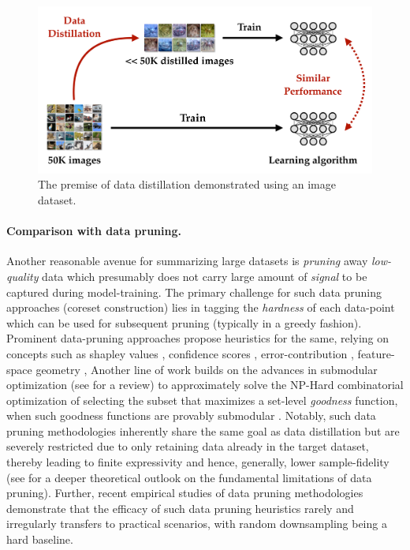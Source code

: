 \documentclass[10pt]{article} %
\begin{document}
\begin{figure}[t!] \centering
    \centering
    \includegraphics[width=0.7\linewidth]{figures/overview.pdf}
    \renewcommand\figurename{\href{https://www.noveens.com/images/dd_survey/overview.pdf}{[HQ Image Link]} Figure}
    \caption{The premise of data distillation demonstrated using an image dataset.}
    \vspace{-0.1cm}
    \label{fig:overview}
\end{figure} 

\paragraph{Comparison with data pruning.} Another reasonable avenue for summarizing large datasets is \emph{pruning} away \emph{low-quality} data which presumably does not carry large amount of \emph{signal} to be captured during model-training. 
The primary challenge for such data pruning approaches (\aka coreset construction) lies in tagging the \emph{hardness} of each data-point which can be used for subsequent pruning (typically in a greedy fashion). Prominent data-pruning approaches propose heuristics for the same, relying on concepts such as shapley values \citep{data_shapley}, confidence scores \citep{svp}, error-contribution \citep{forgetting}, feature-space geometry \citep{data_quality,herding,semdedup}, \etc
Another line of work builds on the advances in submodular optimization (see \citet{bilmes_submodularity} for a review) to approximately solve the NP-Hard combinatorial optimization of selecting the subset that maximizes a set-level \emph{goodness} function, when such goodness functions are provably submodular \citep{craig,grad_match,selcon_coreset}.
Notably, such data pruning methodologies inherently share the same goal as data distillation but are severely restricted due to only retaining data already in the target dataset, thereby leading to finite expressivity and hence, generally, lower sample-fidelity (see \citet{data_pruning_limitations} for a deeper theoretical outlook on the fundamental limitations of data pruning). Further, recent empirical studies of data pruning methodologies \citep{deepcore} demonstrate that the efficacy of such data pruning heuristics rarely and irregularly transfers to practical scenarios, with random downsampling being a hard baseline.
\end{document}
